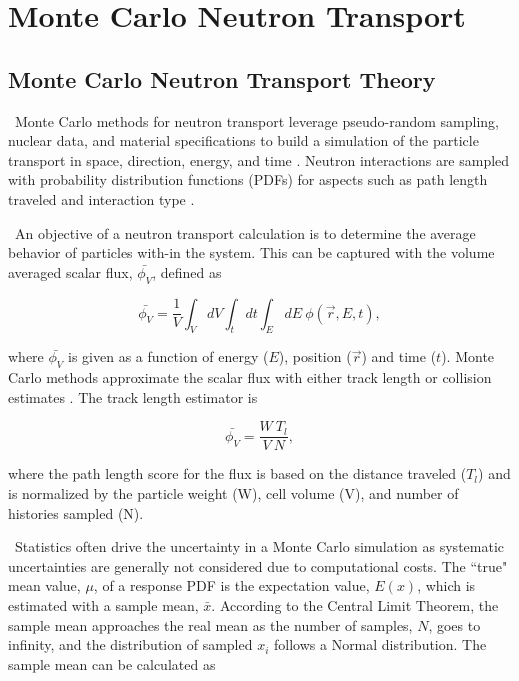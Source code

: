 \section{Monte Carlo Neutron Transport}
\subsection{Monte Carlo Neutron Transport Theory}
\ Monte Carlo methods for neutron transport leverage pseudo-random sampling, nuclear data, and material specifications to build a simulation of the particle transport in space, direction, energy, and time \cite{Luciano2012a}. 
Neutron interactions are sampled with probability distribution functions (PDFs) for aspects such as path length traveled and interaction type \cite{Lewis1984}. 

\ An objective of a neutron transport calculation is to determine the average behavior of particles with-in the system. 
This can be captured with the volume averaged scalar flux, $\bar{\phi_V}$, defined as

\begin{equation} \label{eq:flux}
\bar{\phi_V} = \frac{1}{V}\int_V dV \int_t dt \int_E dE\: \phi(\vec{r}, E,t),
\end{equation}

\noindent where  $\bar{\phi_V}$ is given as a function of energy ($E$), position ($\vec{r}$) and time ($t$).
Monte Carlo methods approximate the scalar flux with either track length or collision estimates \cite{Lewis1984}. The track length estimator is 

\begin{equation} \label{eq:track}
\bar{\phi_V}  = \frac{W \: T_l}{V \: N},
\end{equation}

\noindent where the path length score for the flux is based on the distance traveled ($T_{l}$) and is normalized by the particle weight (W), cell volume (V), and number of histories sampled (N).

\ Statistics often drive the uncertainty in a Monte Carlo simulation as systematic uncertainties are generally not considered due to computational costs. 
The ``true" mean value, $\mu$, of a response PDF is the expectation value, $E(x)$, which is estimated with a sample mean, $\bar{x}$. 
According to the Central Limit Theorem, the sample mean approaches the real mean as the number of samples, $N$, goes to infinity, and the distribution of sampled $x_i$ follows a Normal distribution.
The sample mean can be calculated as

